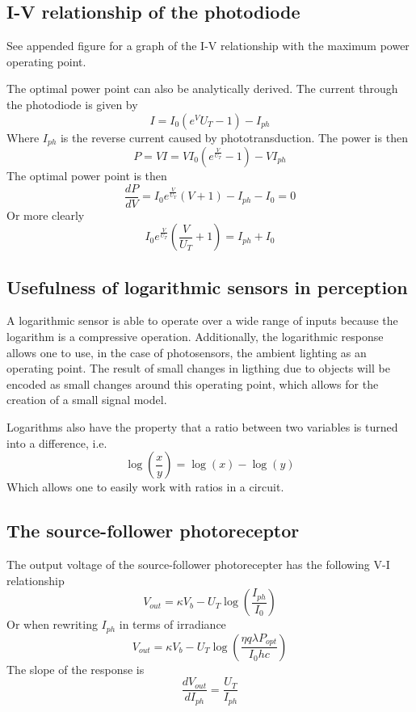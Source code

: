 \subsection{I-V relationship of the photodiode}
See appended figure for a graph of the I-V relationship with the maximum power operating point. 

The optimal power point can also be analytically derived. The current through the photodiode is given by
\begin{equation*}
    I = I_0\left(e^{V}{U_T}-1\right)-I_{ph}
\end{equation*}
Where \(I_{ph}\) is the reverse current caused by phototransduction. The power is then
\begin{equation*}
    P = VI = VI_0\left(e^{\frac{V}{U_T}}-1\right) -VI_{ph}
\end{equation*}
The optimal power point is then
\begin{equation*}
    \frac{dP}{dV} = I_0e^{\frac{V}{U_T}}\left(V+1\right) - I_{ph} - I_0 = 0
\end{equation*}
Or more clearly
\begin{equation*}
    I_0e^{\frac{V}{U_T}}\left(\frac{V}{U_T}+1\right) = I_{ph} + I_0
\end{equation*}

\subsection{Usefulness of logarithmic sensors in perception}
A logarithmic sensor is able to operate over a wide range of inputs because the logarithm is a compressive operation.
Additionally, the logarithmic response allows one to use, in the case of photosensors, the ambient lighting as an 
operating point. The result of small changes in ligthing due to objects will be encoded as small changes around this operating
point, which allows for the creation of a small signal model.

Logarithms also have the property that a ratio between two variables is turned into a difference, i.e.
\begin{equation*}
    \log\left(\frac{x}{y}\right) = \log(x) - \log(y)
\end{equation*}
Which allows one to easily work with ratios in a circuit.

\subsection{The source-follower photoreceptor}
The output voltage of the source-follower photorecepter has the following V-I relationship
\begin{equation*}
    V_{out} = \kappa V_b - U_T\log\left(\frac{I_{ph}}{I_0}\right)
\end{equation*}
Or when rewriting \(I_{ph}\) in terms of irradiance
\begin{equation*}
    V_{out} = \kappa V_b - U_T\log\left(\frac{\eta q\lambda P_{opt}}{I_0hc}\right)
\end{equation*}
The slope of the response is
\begin{equation*}
    \frac{dV_{out}}{dI_{ph}} = \frac{U_T}{I_{ph}}
\end{equation*}


